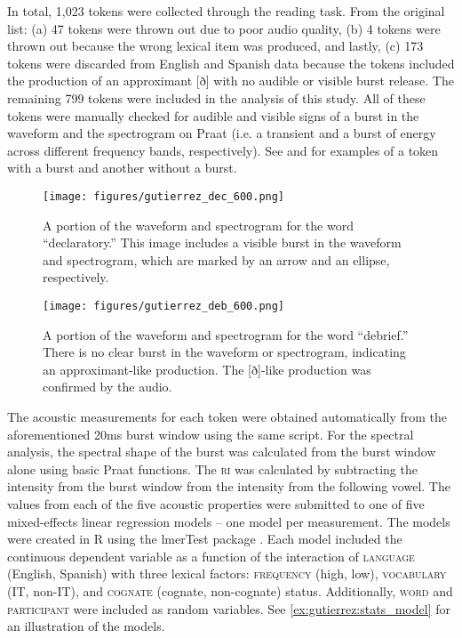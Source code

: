\documentclass[output=paper,colorlinks,citecolor=brown,
]{langscibook}
\begin{document}
In total, 1,023 tokens were collected through the reading task. From the original list: (a) 47 tokens were thrown out due to poor audio quality, (b) 4 tokens were thrown out because the wrong lexical item was produced, and lastly, (c) 173 tokens were discarded from English and Spanish data because the tokens included the production of an approximant [ð] with no audible or visible burst release. The remaining 799 tokens were included in the analysis of this study. All of these tokens were manually checked for audible and visible signs of a burst in the waveform and the spectrogram on Praat (i.e. a transient and a burst of energy across different frequency bands, respectively). See  and  for examples of a token with a burst and another without a burst.

\begin{figure}
    
    \texttt{[image: figures/gutierrez\_dec\_600.png]}
    \caption{A portion of the waveform and spectrogram for the word ``declaratory.'' This image includes a visible burst in the waveform and spectrogram, which are marked by an arrow and an ellipse, respectively.}
    \label{fig:gutierrez:declaratory}
\end{figure}

\begin{figure}
    
    \texttt{[image: figures/gutierrez\_deb\_600.png]}
    \caption{A portion of the waveform and spectrogram for the word ``debrief.'' There is no clear burst in the waveform or spectrogram, indicating an approximant-like production. The [ð]-like production was confirmed by the audio.}
    \label{fig:gutierrez:debriefing}
\end{figure}

The acoustic measurements for each token were obtained automatically from the aforementioned 20ms burst window using the same script. For the spectral analysis, the spectral shape of the burst was calculated from the burst window alone using basic Praat functions. The \textsc{ri} was calculated by subtracting the intensity from the burst window from the intensity from the following vowel. The values from each of the five acoustic properties were submitted to one of five mixed-effects linear regression models -- one model per measurement. The models were created in R using the lmerTest package \citep{r,lmer}. Each model included the continuous dependent variable as a function of the interaction of \textsc{language} (English, Spanish) with three lexical factors: \textsc{frequency} (high, low), \textsc{vocabulary} (IT, non-IT), and \textsc{cognate} (cognate, non-cognate) status. Additionally, \textsc{word} and \textsc{participant} were included as random variables. See \ref{ex:gutierrez:stats_model} for an illustration of the models.
\end{document}
